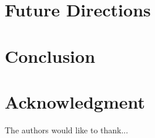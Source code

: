 \documentclass[10pt,conference]{IEEEtran}
\begin{document}
\section{Future Directions}\label{sec:future}

\section{Conclusion}\label{sec:conclusion}


\section*{Acknowledgment}

The authors would like to thank... \cite{simms2007}





\end{document}
